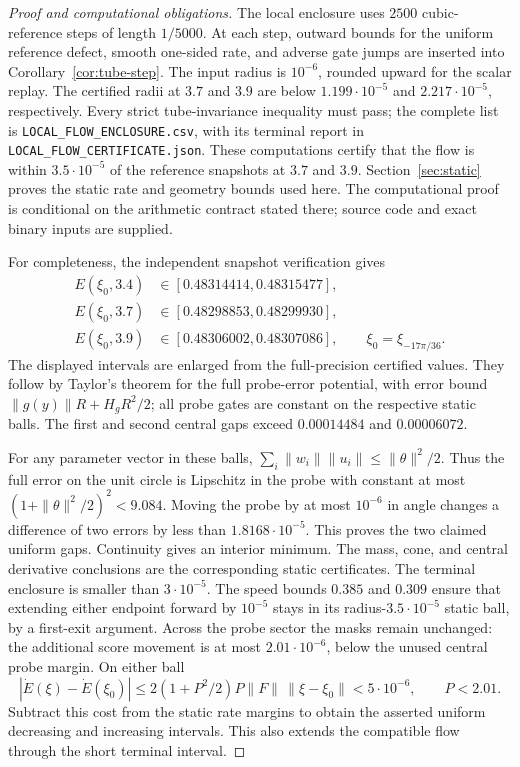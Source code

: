 \documentclass[10pt]{article}
\begin{document}
\begin{proof}[Proof and computational obligations]
The local enclosure uses $2500$ cubic-reference steps of length $1/5000$.
At each step, outward bounds for the uniform reference defect, smooth
one-sided rate, and adverse gate jumps are inserted into
Corollary~\ref{cor:tube-step}. The input radius is $10^{-6}$, rounded upward for the scalar replay.
The certified radii at $3.7$ and $3.9$ are below
$1.199\cdot10^{-5}$ and $2.217\cdot10^{-5}$, respectively.
Every strict tube-invariance inequality must pass; the complete list is
\texttt{LOCAL\_FLOW\_ENCLOSURE.csv}, with its terminal report in
\texttt{LOCAL\_FLOW\_CERTIFICATE.json}. These computations certify that
the flow is within $3.5\cdot10^{-5}$ of the reference snapshots at $3.7$
and $3.9$. Section~\ref{sec:static} proves the static rate and geometry
bounds used here. The computational proof is conditional on the arithmetic
contract stated there; source code and exact binary inputs are supplied.

For completeness, the independent snapshot verification gives
\begin{align*}
 E(\xi_0,3.4)&\in[0.48314414,0.48315477],\\
 E(\xi_0,3.7)&\in[0.48298853,0.48299930],\\
 E(\xi_0,3.9)&\in[0.48306002,0.48307086],
 \qquad \xi_0=\xi_{-17\pi/36}.
\end{align*}
The displayed intervals are enlarged from the full-precision certified
values. They follow by Taylor's theorem for the full probe-error potential,
with error bound $\|g(y)\|R+H_gR^2/2$; all probe gates are constant
on the respective static balls. The first and second central gaps exceed
$0.00014484$ and $0.00006072$.

For any parameter vector in these balls,
$\sum_i\|w_i\|\|u_i\|\le\|\theta\|^2/2$.
Thus the full error on the unit circle is Lipschitz in the probe with
constant at most $(1+\|\theta\|^2/2)^2<9.084$.
Moving the probe by at most $10^{-6}$ in angle changes a difference of
two errors by less than $1.8168\cdot10^{-5}$. This proves the two
claimed uniform gaps. Continuity gives an interior minimum. The mass,
cone, and central derivative conclusions are the corresponding static
certificates. The terminal enclosure is smaller than $3\cdot10^{-5}$.
The speed bounds $0.385$ and $0.309$ ensure that extending either
endpoint forward by $10^{-5}$ stays in its radius-$3.5\cdot10^{-5}$
static ball, by a first-exit argument. Across the probe sector the masks
remain unchanged: the additional score movement is at most
$2.01\cdot10^{-6}$, below the unused central probe margin. On either ball
\[
 |\dot E(\xi)-\dot E(\xi_0)|
 \le2(1+P^2/2)P\|F\|\,\|\xi-\xi_0\|
 <5\cdot10^{-6},\qquad P<2.01.
\]
Subtract this cost from the static rate margins to obtain the asserted
uniform decreasing and increasing intervals. This also extends the
compatible flow through the short terminal interval.
\end{proof}
\end{document}
